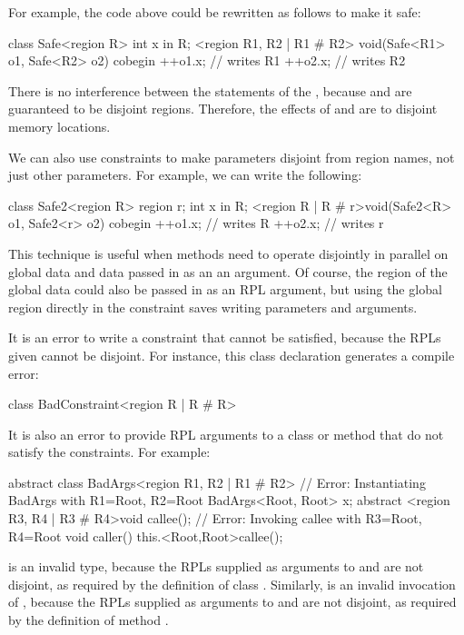 For example, the code above could be rewritten as follows to make it
safe:
%
\begin{dpjlisting}
class Safe<region R> {
    int x in R;
    <region R1, R2 | R1 # R2> void(Safe<R1> o1, Safe<R2> o2) {
        cobegin {
            ++o1.x; // writes R1
            ++o2.x; // writes R2
        }
    }
}
\end{dpjlisting}
%
There is no interference between the statements of the ,
because  and  are guaranteed to be disjoint regions.
Therefore, the effects of  and  are to
disjoint memory locations.

We can also use constraints to make parameters disjoint from region
names, not just other parameters.  For example, we can write the
following:
%
\begin{dpjlisting}
class Safe2<region R> {
    region r;
    int x in R;
    <region R | R # r>void(Safe2<R> o1, Safe2<r> o2) {
        cobegin {
            ++o1.x; // writes R
            ++o2.x; // writes r
        }
    }
}
\end{dpjlisting}
%
This technique is useful when methods need to operate disjointly in
parallel on global data and data passed in as an an argument.  Of
course, the region of the global data could also be passed in as an
RPL argument, but using the global region directly in the constraint
saves writing parameters and arguments.

It is an error to write a constraint that cannot be satisfied, because
the RPLs given cannot be disjoint.  For instance, this class
declaration generates a compile error:
%
\begin{dpjlisting}
class BadConstraint<region R | R # R> {}
\end{dpjlisting}

It is also an error to provide RPL arguments to a class or method that
do not satisfy the constraints.  For example:
%
\begin{dpjlisting}
abstract class BadArgs<region R1, R2 | R1 # R2> {
    // Error:  Instantiating BadArgs with R1=Root, R2=Root
    BadArgs<Root, Root> x;
    abstract <region R3, R4 | R3 # R4>void callee();
    // Error:  Invoking callee with R3=Root, R4=Root
    void caller() {
        this.<Root,Root>callee();
    }
}
\end{dpjlisting}
%
 is an invalid type, because the RPLs
supplied as arguments to  and  are not disjoint, as
required by the definition of class .  Similarly,
 is an invalid invocation of
, because the RPLs supplied as arguments to  and
 are not disjoint, as required by the definition of method
.

